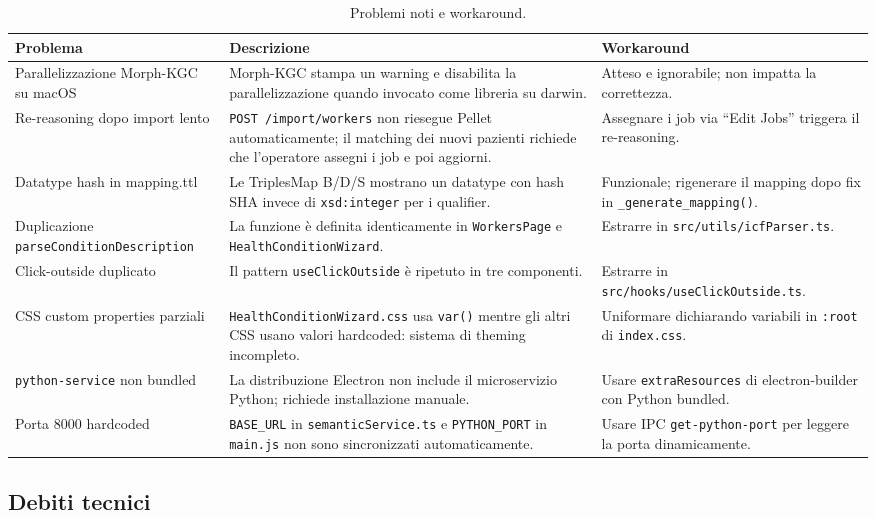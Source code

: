 \documentclass[a4paper,12pt]{article}
\begin{document}
\begin{table}[H]
\centering
\small
\caption{Problemi noti e workaround.}
\begin{tabular}{L{3.5cm} L{5.8cm} L{3.2cm}}
\toprule
\textbf{Problema} & \textbf{Descrizione} & \textbf{Workaround} \\
\midrule
Parallelizzazione Morph-KGC su macOS &
  Morph-KGC stampa un warning e disabilita la parallelizzazione quando
  invocato come libreria su darwin. &
  Atteso e ignorabile; non impatta la correttezza. \\[4pt]
Re-reasoning dopo import lento &
  \texttt{POST /import/workers} non riesegue Pellet automaticamente;
  il matching dei nuovi pazienti richiede che l'operatore assegni
  i job e poi aggiorni. &
  Assegnare i job via ``Edit Jobs'' triggera il re-reasoning. \\[4pt]
Datatype hash in mapping.ttl &
  Le TriplesMap B/D/S mostrano un datatype con hash SHA invece di
  \texttt{xsd:integer} per i qualifier. &
  Funzionale; rigenerare il mapping dopo fix in \texttt{\_generate\_mapping()}. \\[4pt]
Duplicazione \texttt{parseConditionDescription} &
  La funzione \`{e} definita identicamente in \texttt{WorkersPage}
  e \texttt{HealthConditionWizard}. &
  Estrarre in \texttt{src/utils/icfParser.ts}. \\[4pt]
Click-outside duplicato &
  Il pattern \texttt{useClickOutside} \`{e} ripetuto in tre componenti. &
  Estrarre in \texttt{src/hooks/useClickOutside.ts}. \\[4pt]
CSS custom properties parziali &
  \texttt{HealthConditionWizard.css} usa \texttt{var()} mentre gli altri
  CSS usano valori hardcoded: sistema di theming incompleto. &
  Uniformare dichiarando variabili in \texttt{:root} di \texttt{index.css}. \\[4pt]
\texttt{python-service} non bundled &
  La distribuzione Electron non include il microservizio Python;
  richiede installazione manuale. &
  Usare \texttt{extraResources} di electron-builder con Python bundled. \\[4pt]
Porta 8000 hardcoded &
  \texttt{BASE\_URL} in \texttt{semanticService.ts} e \texttt{PYTHON\_PORT}
  in \texttt{main.js} non sono sincronizzati automaticamente. &
  Usare IPC \texttt{get-python-port} per leggere la porta dinamicamente. \\
\bottomrule
\end{tabular}
\end{table}

\subsection{Debiti tecnici}
\end{document}
